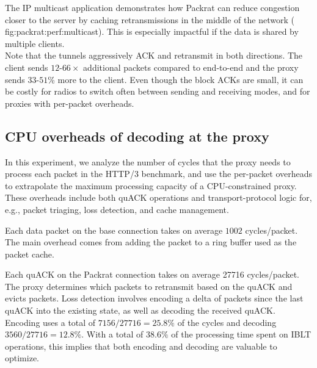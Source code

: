The IP multicast application demonstrates how Packrat can reduce congestion closer
to the server by caching retransmissions in the middle of the network (\Cref
{fig:packrat:perf:multicast}). This is especially impactful if the data is shared by
multiple clients.\\

\noindent Note that the tunnels aggressively ACK and retransmit in both
directions. The client sends $12$-$66\!\times$ additional packets compared to
end-to-end and the proxy sends $33$-$51$\% more to the client. Even though the
block ACKs are small, it can be costly for radios to switch often between
sending and receiving modes, and for proxies with per-packet overheads.

\subsection{CPU overheads of decoding at the proxy}
\label{sec:packrat:emulation:cpu-overheads}

In this experiment, we analyze the number of cycles that the proxy
needs to process each
packet in the HTTP/3 benchmark, and use the per-packet overheads to extrapolate
the maximum processing capacity of a CPU-constrained proxy. These overheads
include both quACK operations and transport-protocol logic for, e.g.,
packet triaging, loss detection, and cache management.

Each data packet on the base connection takes on average $1002$ cycles/packet.
The main overhead comes from adding the packet to a ring buffer used as the
packet cache.

Each quACK on the Packrat connection takes on average 27716 cycles/packet. The
proxy determines which packets to retransmit based on the quACK and evicts
packets. Loss detection involves encoding a delta of packets since the last
quACK into the existing state, as well as decoding the received quACK. Encoding
uses a total of $7156/27716 = 25.8\%$ of the cycles and decoding $3560/27716 =
12.8\%$. With a total of $38.6\%$ of the processing time spent on IBLT
operations, this implies that both encoding and decoding are valuable to optimize.



